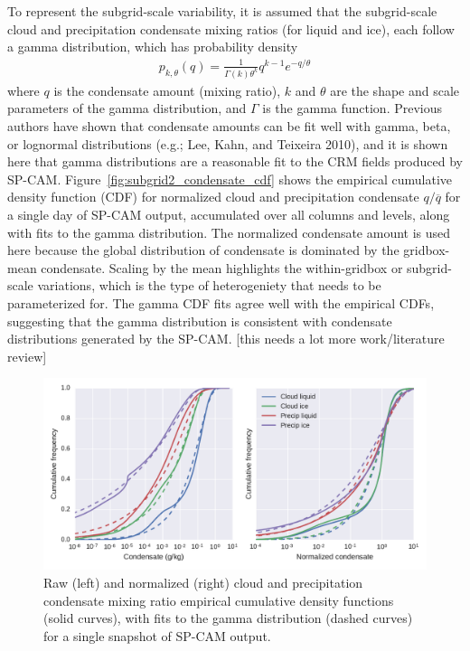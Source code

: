 To represent the subgrid-scale variability, it is assumed that the
subgrid-scale cloud and precipitation condensate mixing ratios (for
liquid and ice), each follow a gamma distribution, which has probability
density \[\begin{gathered}
    p_{k, \theta}(q) = \frac{1}{\Gamma(k) \theta^k} q^{k - 1} e^{-q/\theta}\end{gathered}\]
where \(q\) is the condensate amount (mixing ratio), \(k\) and
\(\theta\) are the shape and scale parameters of the gamma distribution,
and \(\Gamma\) is the gamma function. Previous authors have shown that
condensate amounts can be fit well with gamma, beta, or lognormal
distributions (e.g.; Lee, Kahn, and Teixeira 2010), and it is shown here
that gamma distributions are a reasonable fit to the CRM fields produced
by SP-CAM. Figure~\ref{fig:subgrid2_condensate_cdf} shows the empirical
cumulative density function (CDF) for normalized cloud and precipitation
condensate \(q / \overline{q}\) for a single day of SP-CAM output,
accumulated over all columns and levels, along with fits to the gamma
distribution. The normalized condensate amount is used here because the
global distribution of condensate is dominated by the gridbox-mean
condensate. Scaling by the mean highlights the within-gridbox or
subgrid-scale variations, which is the type of heterogeniety that needs
to be parameterized for. The gamma CDF fits agree well with the
empirical CDFs, suggesting that the gamma distribution is consistent
with condensate distributions generated by the SP-CAM. {[}this needs a
lot more work/literature review{]}

\begin{figure}[htbp]
\centering
\includegraphics{graphics/subgrid2_mxratio_cdf1.pdf}
\caption{\label{fig:subgrid2_condensate_cdf}Raw (left) and normalized
(right) cloud and precipitation condensate mixing ratio empirical
cumulative density functions (solid curves), with fits to the gamma
distribution (dashed curves) for a single snapshot of SP-CAM
output.}\label{fig:subgrid2ux5fcondensateux5fcdf}
\end{figure}

